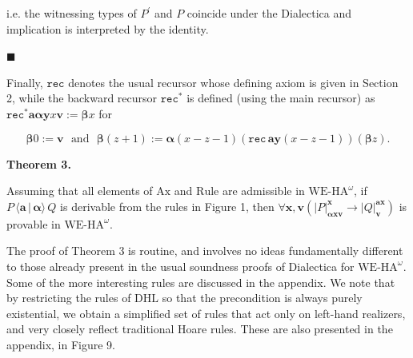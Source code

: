 \documentclass[10pt,a4paper]{article}
\begin{document}
i.e. the witnessing types of $P^{\prime}$ and $P$ coincide under the Dialectica and implication is interpreted by the identity.\par
 
 
 
\par\noindent  $\blacksquare$ 
 
Finally, $\mathtt{rec}$ denotes the usual recursor whose defining axiom is given in Section 2, while the backward recursor $\mathtt{rec}^{\ast}$ is defined (using the main recursor) as $\mathtt{rec}^{\ast}\bm{a}\bm{\alpha}\bm{y}x\bm{v}:=\bm{\beta}x$ for\par
  
\par  \quad  \[\bm{\beta}0:=\bm{v}\ \ \ \mbox{and}\ \ \ \bm{\beta}(z+1):=\bm{\alpha}(x-z-1)(\mathtt{rec}\,\bm{a}\bm{y}(x-z-1))(\bm{\beta}z).\]\quad  \quad  
  
 
  
 
 
\par\medskip\noindent\textbf{Theorem 3.}\par
 
 
Assuming that all elements of $\mathrm{Ax}$ and $\mathrm{Rule}$ are admissible in $\mathrm{WE}\mbox{-}\mathrm{HA}^{\omega}$, if ${P}\,{\langle{\bm{a}}\,|\,{\bm{\alpha}}\rangle}\,{Q}$ is derivable from the rules in Figure 1, then $\forall\bm{x},\bm{v}\left(|{P}|^{\bm{x}}_{\bm{\alpha}\bm{x}\bm{v}}\to|{Q}|^{\bm{a}\bm{x}}_{\bm{v}}\right)$ is provable in $\mathrm{WE}\mbox{-}\mathrm{HA}^{\omega}$.\par
 
 
 
 
The proof of Theorem 3 is routine, and involves no ideas fundamentally different to those already present in the usual soundness proofs of Dialectica for $\mathrm{WE}\mbox{-}\mathrm{HA}^{\omega}$. Some of the more interesting rules are discussed in the appendix. We note that by restricting the rules of $\mathrm{DHL}$ so that the precondition is always purely existential, we obtain a simplified set of rules that act only on left-hand realizers, and very closely reflect traditional Hoare rules. These are also presented in the appendix, in Figure 9.\par
 
\end{document}
